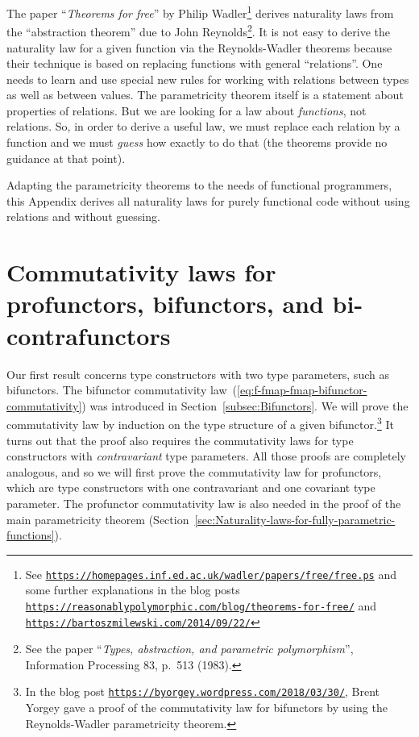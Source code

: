 The paper ``\emph{Theorems for free}'' by Philip
Wadler\footnote{See \texttt{\href{https://homepages.inf.ed.ac.uk/wadler/papers/free/free.ps}{https://homepages.inf.ed.ac.uk/wadler/papers/free/free.ps}}
and some further explanations in the blog posts \texttt{\href{https://reasonablypolymorphic.com/blog/theorems-for-free/}{https://reasonablypolymorphic.com/blog/theorems-for-free/}}
and \texttt{\href{https://bartoszmilewski.com/2014/09/22/}{https://bartoszmilewski.com/2014/09/22/}}} derives naturality laws from the ``abstraction theorem'' due to
John Reynolds\footnote{See the paper ``\emph{Types, abstraction, and parametric polymorphism}'',
Information Processing 83, p.~513 (1983).}. It is not easy to derive the naturality law for a given function
via the Reynolds-Wadler theorems because their technique is based
on replacing functions with general ``relations''. One needs to
learn and use special new rules for working with relations between
types as well as between values. The parametricity theorem itself
is a statement about properties of relations. But we are looking for
a law about \emph{functions}, not relations. So, in order to derive
a useful law, we must replace each relation by a function \textemdash{}
and we must \emph{guess} how exactly to do that (the theorems provide
no guidance at that point).

Adapting the parametricity theorems to the needs of functional programmers,
this Appendix derives all naturality laws for purely functional code
without using relations and without guessing.

\section{Commutativity laws for profunctors, bifunctors, and bi-contrafunctors}

Our first result concerns type constructors with two type parameters,
such as bifunctors. The bifunctor commutativity law~(\ref{eq:f-fmap-fmap-bifunctor-commutativity})
was introduced in Section~\ref{subsec:Bifunctors}. We will prove
the commutativity law by induction on the type structure of a given
bifunctor.\footnote{In the blog post \texttt{\href{https://byorgey.wordpress.com/2018/03/30/}{https://byorgey.wordpress.com/2018/03/30/}},
Brent Yorgey gave a proof of the commutativity
law for bifunctors by using the Reynolds-Wadler parametricity
theorem. } It turns out that the proof also requires the commutativity laws
for type constructors with \emph{contravariant} type parameters. All
those proofs are completely analogous, and so we will first prove
the commutativity law for profunctors, which are type constructors
with one contravariant and one covariant type parameter. The profunctor
commutativity law is also needed in the proof of the main parametricity
theorem (Section~\ref{sec:Naturality-laws-for-fully-parametric-functions}). 

